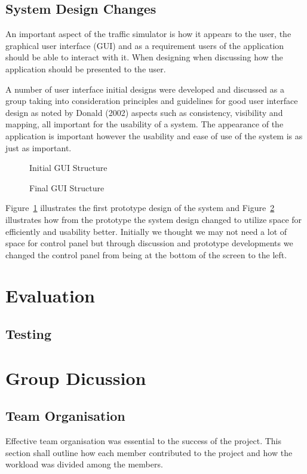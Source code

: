 \documentclass[11pt]{article}
\begin{document}
	\subsection{System Design Changes}
	An important aspect of the traffic simulator is how it appears to the user, the graphical user interface (GUI) and as a requirement users of the application should be able to interact with it. When designing when discussing how the application should be presented to the user.
	
	A number of user interface initial designs were developed and discussed as a group taking into consideration principles and guidelines for good user interface design as noted by Donald \cite{Norman} (2002) aspects such as consistency, visibility and mapping, all important for the usability of a system. The appearance of the application is important however the usability and ease of use of the system is as just as important.
	\begin{figure}[h]
	\caption{Initial GUI Structure}
	\label{initialGUI}
	\end{figure}
	
	\begin{figure}[h]
	\caption{Final GUI Structure}
	\label{finalGUI}
	\end{figure}
	Figure~\ref{initialGUI} illustrates the first prototype design of the system and Figure~\ref{finalGUI} illustrates how from the prototype the system design changed to utilize space for efficiently and usability better. 
	Initially we thought we may not need a lot of space for control panel but through discussion and prototype developments we changed the control panel from being at the bottom of the screen to the left. 
	
	\section{Evaluation} %
	\subsection{Testing} %
	\section{Group Dicussion}
	\subsection{Team Organisation} %
	Effective team organisation was essential to the success of the project. This section shall outline how each member contributed to the project and how the workload was divided among the members. 
	
\end{document}
